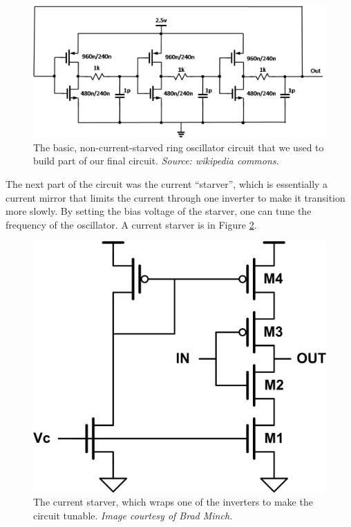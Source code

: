 \documentclass{article}
\begin{document}
\begin{figure}[H]
\centering
\includegraphics[scale=.5]{ringOsc.png}
\caption{The basic, non-current-starved ring oscillator circuit that we used to build part of our final circuit.  \emph{Source: wikipedia commons.}}
\label{ring}
\end{figure}

The next part of the circuit was the current ``starver'', which is essentially a current mirror that limits the current through one inverter to make it transition more slowly. By setting the bias voltage of the starver, one can tune the frequency of the oscillator.  A current starver is in Figure \ref{starver}. 
					
\begin{figure}[H]	
\centering			
\includegraphics[scale=.5]{starver.jpg}
\caption{The current starver, which wraps one of the inverters to make the circuit tunable. \emph{Image courtesy of Brad Minch.}}
\label{starver}		
\end{figure} 		
\end{document}
